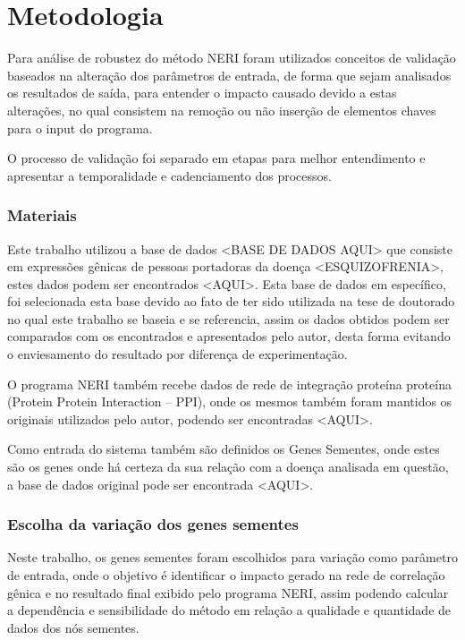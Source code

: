 \chapter[Metodologia]{Metodologia}

Para análise de robustez do método NERI foram utilizados conceitos de validação baseados na alteração dos parâmetros de entrada, de forma que sejam analisados os resultados de saída, para entender o impacto causado devido a estas alterações, no qual consistem na remoção ou não inserção de elementos chaves para o input do programa. 

O processo de validação foi separado em etapas para melhor entendimento e apresentar a temporalidade e cadenciamento dos processos.

\subsection{Materiais}

Este trabalho utilizou a base de dados <BASE DE DADOS AQUI> que consiste em expressões gênicas de pessoas portadoras da doença <ESQUIZOFRENIA>, estes dados podem ser encontrados <AQUI>. Esta base de dados em específico, foi selecionada esta base devido ao fato de ter sido utilizada na tese de doutorado no qual este trabalho se baseia e se referencia, assim os dados obtidos podem ser comparados com os encontrados e apresentados pelo autor, desta forma evitando o enviesamento do resultado por diferença de experimentação.

O programa NERI também recebe dados de rede de integração proteína proteína (Protein Protein Interaction – PPI), onde os mesmos também foram mantidos os originais utilizados pelo autor, podendo ser encontradas <AQUI>.

Como entrada do sistema também são definidos os Genes Sementes, onde estes são os genes onde há certeza da sua relação com a doença analisada em questão, a base de dados original pode ser encontrada <AQUI>. 


\subsection{Escolha da variação dos genes sementes}
Neste trabalho, os genes sementes foram escolhidos para variação como parâmetro de entrada, onde o objetivo é identificar o impacto gerado na rede de correlação gênica e no resultado final exibido pelo programa NERI, assim podendo calcular a dependência e sensibilidade do método em relação a qualidade e quantidade de dados dos nós sementes.


